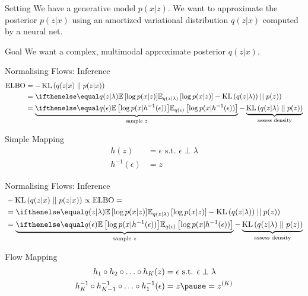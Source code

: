 \documentclass[14pt]{beamer}
\begin{document}
\begin{frame}{Setting}
We have a generative model $ p(x|z) $. We want to approximate the posterior $ p(z|x) $ using an amortized variational distribution $ q(z|x) $ computed by a neural net.
\pause
\begin{block}{Goal}
We want a complex, multimodal approximate posterior $ q(z|x) $.
\end{block}
\end{frame}

\begin{frame}{Normalising Flows: Inference}
\begin{equation*}
\begin{aligned}
\ELBO &= -\KL{q(z|x)}{p(z|x)} \\
&= \E[q(z|\lambda)]{\log p(x|z)} - \KL{q(z|\lambda))}{p(z)} \\
&= \underbrace{\E[q(\epsilon)]{\log p(x|h^{-1}(\epsilon))}}_{\text{sample $ z $}} - \underbrace{\KL{q(z|\lambda)}{p(z)}}_{\text{assess density}}
\end{aligned}
\end{equation*}
\begin{block}{Simple Mapping}
\begin{equation*}
\begin{aligned}
h(z) &= \epsilon \text{ s.t. } \epsilon \perp \lambda \\
h^{-1}(\epsilon) &= z
\end{aligned}
\end{equation*}
\end{block}
\end{frame}

\begin{frame}{Normalising Flows: Inference}
\begin{equation*}
\begin{aligned}
&-\KL{q(z|x)}{p(z|x)} \propto \ELBO = \\
&= \E[q(z|\lambda)]{\log p(x|z)} - \KL{q(z|\lambda))}{p(z)} \\
&= \underbrace{\E[q(\epsilon)]{\log p(x|h^{-1}(\epsilon))}}_{\text{sample $ z $}} - \underbrace{\KL{q(z|\lambda)}{p(z)}}_{\text{assess density}}
\end{aligned}
\end{equation*}
\begin{block}{Flow Mapping}
\begin{equation*}
\begin{aligned}
h_{1}\circ h_{2}\circ \ldots \circ h_{K}(z) &= \epsilon \text{ s.t. } \epsilon \perp \lambda \\
h^{-1}_{K}\circ h^{-1}_{K-1}\circ\ldots \circ h^{-1}_{1}(\epsilon) &= z \pause = z^{(K)}
\end{aligned}
\end{equation*}
\end{block}
\end{frame}
\end{document}
